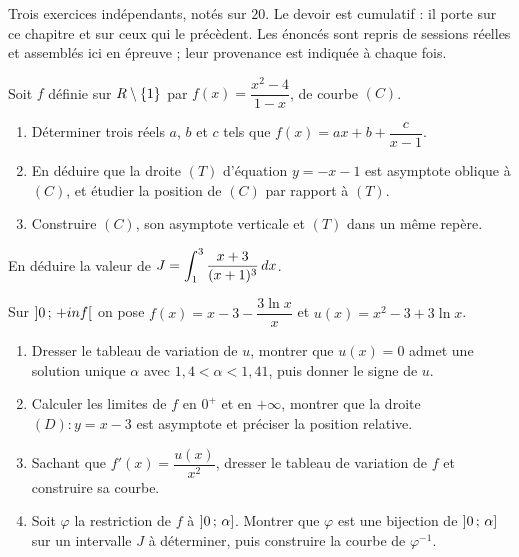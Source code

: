 \begin{devoir}[2 heures]
Trois exercices indépendants, notés sur $20$. Le devoir est cumulatif : il porte sur ce chapitre et sur ceux qui le précèdent. Les énoncés sont repris de sessions réelles et assemblés ici en épreuve ; leur provenance est indiquée à chaque fois.

Soit $f$ définie sur $R\setminus\{1\}$ par $f(x) = \dfrac{x^{2}-4}{1-x}$, de
courbe $(C)$.
\begin{enumerate}[label=\textbf{\alph*)}, leftmargin=*, itemsep=0.15em]
  \item Déterminer trois réels $a$, $b$ et $c$ tels que
        $f(x) = ax+b+\dfrac{c}{x-1}$.
  \item En déduire que la droite $(T)$ d'équation $y = -x-1$ est asymptote
        oblique à $(C)$, et étudier la position de $(C)$ par rapport à $(T)$.
  \item Construire $(C)$, son asymptote verticale et $(T)$ dans un même
        repère.
\end{enumerate}

En déduire la valeur de
$\displaystyle J = \int_{1}^{3}\frac{x+3}{(x+1)^{3}}\,dx$.

\medskip

Sur $\left]0\,;\,+inf\right[$ on pose $f(x) = x-3-\dfrac{3\ln x}{x}$ et
$u(x) = x^{2}-3+3\ln x$.
\begin{enumerate}[label=\textbf{\arabic*)}, leftmargin=*, itemsep=0.15em]
  \item Dresser le tableau de variation de $u$, montrer que $u(x) = 0$ admet
        une solution unique $\alpha$ avec $1{,}4 < \alpha < 1{,}41$, puis
        donner le signe de $u$.
  \item Calculer les limites de $f$ en $0^{+}$ et en $+\infty$, montrer que la
        droite $(D) : y = x-3$ est asymptote et préciser la position relative.
  \item Sachant que $f'(x) = \dfrac{u(x)}{x^{2}}$, dresser le tableau de
        variation de $f$ et construire sa courbe.
  \item Soit $\varphi$ la restriction de $f$ à $\left]0\,;\,\alpha\right]$.
        Montrer que $\varphi$ est une bijection de $\left]0\,;\,\alpha\right]$
        sur un intervalle $J$ à déterminer, puis construire la courbe de
        $\varphi^{-1}$.
\end{enumerate}

\end{devoir}

